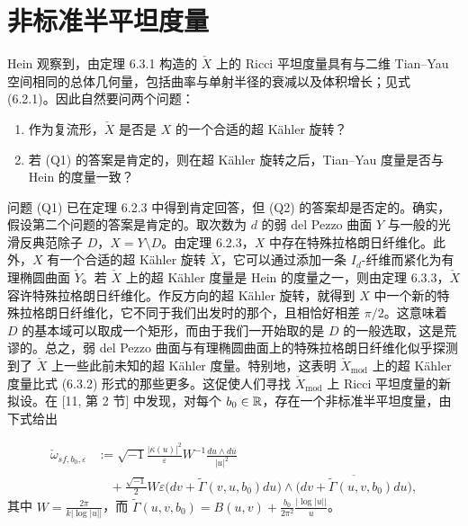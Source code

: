 \section{非标准半平坦度量}
Hein 观察到，由定理 6.3.1 构造的 $\check X$ 上的 Ricci 平坦度量具有与二维 Tian--Yau 空间相同的总体几何量，包括曲率与单射半径的衰减以及体积增长；见式 (6.2.1)。因此自然要问两个问题：
\begin{enumerate}
\item[(Q1)] 作为复流形，$\check X$ 是否是 $X$ 的一个合适的超 Kähler 旋转？
\item[(Q2)] 若 (Q1) 的答案是肯定的，则在超 Kähler 旋转之后，Tian--Yau 度量是否与 Hein 的度量一致？
\end{enumerate}
问题 (Q1) 已在定理 6.2.3 中得到肯定回答，但 (Q2) 的答案却是否定的。确实，假设第二个问题的答案是肯定的。取次数为 $d$ 的弱 del Pezzo 曲面 $Y$ 与一般的光滑反典范除子 $D$，$X=Y\setminus D$。由定理 6.2.3，$X$ 中存在特殊拉格朗日纤维化。此外，$X$ 有一个合适的超 Kähler 旋转 $\check X$，它可以通过添加一条 $I_d$-纤维而紧化为有理椭圆曲面 $\check Y$。若 $\check X$ 上的超 Kähler 度量是 Hein 的度量之一，则由定理 6.3.3，$\check X$ 容许特殊拉格朗日纤维化。作反方向的超 Kähler 旋转，就得到 $X$ 中一个新的特殊拉格朗日纤维化，它不同于我们出发时的那个，且相恰好相差 $\pi/2$。这意味着 $D$ 的基本域可以取成一个矩形，而由于我们一开始取的是 $D$ 的一般选取，这是荒谬的。总之，弱 del Pezzo 曲面与有理椭圆曲面上的特殊拉格朗日纤维化似乎探测到了 $\check X$ 上一些此前未知的超 Kähler 度量。特别地，这表明 $\check X_{\mathrm{mod}}$ 上的超 Kähler 度量比式 (6.3.2) 形式的那些更多。这促使人们寻找 $\check X_{\mathrm{mod}}$ 上 Ricci 平坦度量的新拟设。在 [11, 第 2 节] 中发现，对每个 $b_0\in\mathbb{R}$，存在一个非标准半平坦度量，由下式给出

\begin{equation*}
\begin{aligned}
\check\omega_{sf,b_0,\varepsilon}&:=\sqrt{-1}\frac{|\kappa(u)|^2}{\varepsilon}W^{-1}\frac{du\wedge d\bar u}{|u|^2}\\
&\quad+\frac{\sqrt{-1}}{2}W\varepsilon\bigl(dv+\widetilde{\Gamma}(v,u,b_0)du\bigr)\wedge\overline{\bigl(dv+\widetilde{\Gamma}(u,v,b_0)du\bigr)},
\end{aligned}
\end{equation*}
其中 $W=\frac{2\pi}{k|\log|u||}$，而 $\widetilde{\Gamma}(u,v,b_0)=B(u,v)+\frac{b_0}{2\pi^2}\frac{|\log|u||}{u}$。

